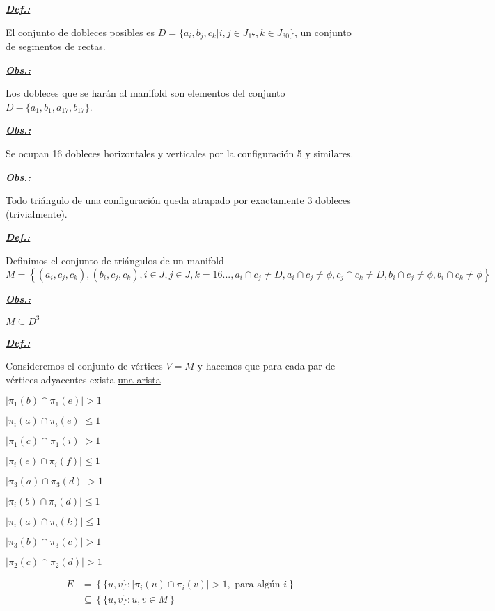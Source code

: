 \documentclass[a4paper, 10pt]{article}
\begin{document}
	
	\textbf{\textit{\underline{Def.:}}}
	
	El conjunto de dobleces posibles es $ D=\{a_i, b_j, c_k | i,j\in J_{17}, k\in J_{30} \} $, un conjunto de segmentos de rectas. 
	
	\textbf{\textit{\underline{Obs.:}}}
	
	Los dobleces que se harán al manifold son elementos del conjunto $ D-\{a_1,b_1,a_{17},b_{17}\} $.
	
	\textbf{\textit{\underline{Obs.:}}}
	
	Se ocupan 16 dobleces horizontales y verticales por la configuración 5 y similares.
	
	\textbf{\textit{\underline{Obs.:}}}
	
	Todo triángulo de una configuración queda atrapado por exactamente \underline{3 dobleces} (trivialmente).
	
	\textbf{\textit{\underline{Def.:}}}
	
	Definimos el conjunto de triángulos de un manifold 
	$$ M=\left\{ (a_i,c_j,c_k), (b_i,c_j,c_k), i\in J, j\in J,k=16..., 
	a_i \cap c_j\neq D, a_i\cap c_j\neq\phi, 
	c_j \cap c_k\neq D, b_i\cap c_j\neq\phi, 
	b_i \cap c_k\neq\phi \right\} $$
	
	\textbf{\textit{\underline{Obs.:}}}
	
	$ M\subseteq D^3 $
	
	\textbf{\textit{\underline{Def.:}}}
	
	Consideremos el conjunto de vértices $ V=M $ y hacemos que para cada par de vértices adyacentes exista \underline{una arista}
	
	$ |\pi_1(b)\cap\pi_1(e)|>1 $
	
	$ |\pi_i(a)\cap\pi_i(e)|\leqslant 1 $
	
	$ |\pi_1(c)\cap\pi_1(i)|>1 $
	
	$ |\pi_i(e)\cap\pi_i(f)|\leqslant 1 $
	
	$ |\pi_3(a)\cap\pi_3(d)|>1 $
	
	$ |\pi_i(b)\cap\pi_i(d)|\leqslant 1 $
	
	$ |\pi_i(a)\cap\pi_i(k)|\leqslant 1 $
	
	$ |\pi_3(b)\cap\pi_3(c)|>1 $
	
	$ |\pi_2(c)\cap\pi_2(d)|>1 $
	
	\begin{align*}
		E&=\left\{ \{u, v\}: |\pi_i(u)\cap\pi_i(v)|>1,\mbox{ para algún }i \right\} \\
		&\subseteq\left\{ \{ u,v \}: u,v\in M \right\}
	\end{align*}
	
\end{document}

